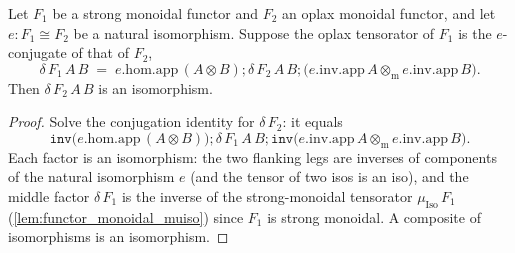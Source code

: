 \begin{lemma}
  \label{lem:isiso_oplaxdelta_of_conj}
  Let \(F_1\) be a strong monoidal functor and \(F_2\) an oplax monoidal functor, and let
  \(e : F_1 \cong F_2\) be a natural isomorphism. Suppose the oplax tensorator of \(F_1\) is the
  \(e\)-conjugate of that of \(F_2\),
  \[
    \delta\,F_1\,A\,B
      \;=\; e.\mathrm{hom}.\mathrm{app}\,(A \otimes B)
        \mathbin{;} \delta\,F_2\,A\,B
        \mathbin{;} \bigl(e.\mathrm{inv}.\mathrm{app}\,A \otimes_{\mathrm m}
          e.\mathrm{inv}.\mathrm{app}\,B\bigr).
  \]
  Then \(\delta\,F_2\,A\,B\) is an isomorphism.
\end{lemma}
\begin{proof}
  \leanok
  Solve the conjugation identity for \(\delta\,F_2\): it equals
  \[
    \mathtt{inv}\bigl(e.\mathrm{hom}.\mathrm{app}\,(A \otimes B)\bigr)
      \mathbin{;} \delta\,F_1\,A\,B
      \mathbin{;} \mathtt{inv}\bigl(e.\mathrm{inv}.\mathrm{app}\,A \otimes_{\mathrm m}
        e.\mathrm{inv}.\mathrm{app}\,B\bigr).
  \]
  Each factor is an isomorphism: the two flanking legs are inverses of components of the natural
  isomorphism \(e\) (and the tensor of two isos is an iso), and the middle factor \(\delta\,F_1\) is
  the inverse of the strong-monoidal tensorator \(\mu_{\mathrm{Iso}}\,F_1\)
  (\cref{lem:functor_monoidal_muiso}) since \(F_1\) is strong monoidal. A composite of isomorphisms
  is an isomorphism.
\end{proof}

